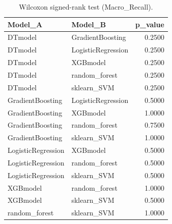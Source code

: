 \begin{table}[t]
\centering
\begin{tabular}{llr}
\toprule
Model_A & Model_B & p_value \\
\midrule
DTmodel & GradientBoosting & 0.2500 \\
DTmodel & LogisticRegression & 0.2500 \\
DTmodel & XGBmodel & 0.2500 \\
DTmodel & random_forest & 0.2500 \\
DTmodel & sklearn_SVM & 0.2500 \\
GradientBoosting & LogisticRegression & 0.5000 \\
GradientBoosting & XGBmodel & 1.0000 \\
GradientBoosting & random_forest & 0.7500 \\
GradientBoosting & sklearn_SVM & 1.0000 \\
LogisticRegression & XGBmodel & 0.5000 \\
LogisticRegression & random_forest & 0.5000 \\
LogisticRegression & sklearn_SVM & 0.5000 \\
XGBmodel & random_forest & 1.0000 \\
XGBmodel & sklearn_SVM & 0.5000 \\
random_forest & sklearn_SVM & 1.0000 \\
\bottomrule
\end{tabular}
\caption{Wilcoxon signed-rank test (Macro_Recall).}
\label{tab:wilcoxon_Macro_Recall}
\end{table}